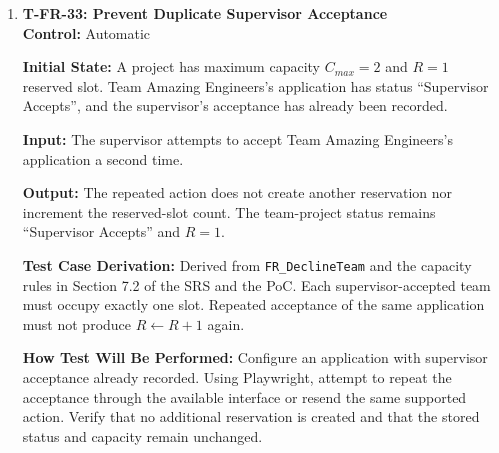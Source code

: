 \documentclass[12pt, titlepage]{article}
\begin{document}
\begin{enumerate}
\textbf{Input:} Team Amazing Engineers accepts Project A's working arrangement.

\textbf{Output:} Team Amazing Engineers reaches ``Agreed'' on Project A, retaining its reservation there. Its application to Project B is withdrawn, releasing the reservation. Project B's reserved slots decrease from 1 to 0, and its status changes from ``Full'' to ``Open''.

\textbf{Test Case Derivation:} Derived from \texttt{FR\_DeclineTeam} and Section 7.2 of the SRS. A team's agreement with one project must release reservations associated with competing applications. For Project B, $R \leftarrow R - 1 = 0$ and $C_{remaining} = 1 - 0 = 1$. This verifies that an agreement does not leave another project's capacity unnecessarily occupied.

\textbf{How Test Will Be Performed:} Configure both projects with Team Amazing Engineers's supervisor-accepted applications. Using Playwright, authenticate as Team Amazing Engineers and accept Project A. Verify the ``Agreed'' status on Project A, withdrawal of the Project B application, and restoration of Project B's availability.

\item \label{T-FR-33}\textbf{T-FR-33: Prevent Duplicate Supervisor Acceptance}\\

\textbf{Control:} Automatic

\textbf{Initial State:} A project has maximum capacity $C_{max} = 2$ and $R = 1$ reserved slot. Team Amazing Engineers's application has status ``Supervisor Accepts'', and the supervisor's acceptance has already been recorded.

\textbf{Input:} The supervisor attempts to accept Team Amazing Engineers's application a second time.

\textbf{Output:} The repeated action does not create another reservation nor increment the reserved-slot count. The team-project status remains ``Supervisor Accepts'' and $R=1$.

\textbf{Test Case Derivation:} Derived from \texttt{FR\_DeclineTeam} and the capacity rules in Section 7.2 of the SRS and the PoC. Each supervisor-accepted team must occupy exactly one slot. Repeated acceptance of the same application must not produce $R \leftarrow R + 1$ again.

\textbf{How Test Will Be Performed:}
Configure an application with supervisor acceptance already recorded. Using Playwright, attempt to repeat the acceptance through the available interface or resend the same supported action. Verify that no additional reservation is created and that the stored status and capacity remain unchanged.

\end{enumerate}
\end{document}
